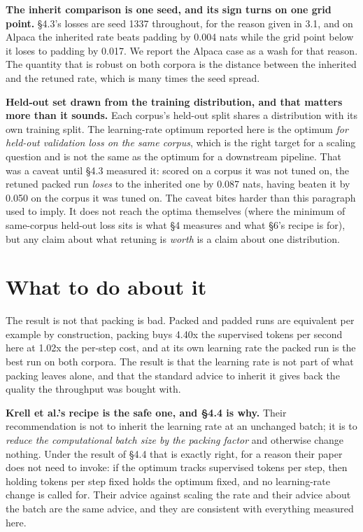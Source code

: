 \documentclass[11pt]{article}
\begin{document}
\textbf{The inherit comparison is one seed, and its sign turns on one grid point.} \S{}4.3's losses are seed 1337 throughout, for the reason given in 3.1, and on Alpaca the inherited rate beats padding by 0.004 nats while the grid point below it loses to padding by 0.017. We report the Alpaca case as a wash for that reason. The quantity that is robust on both corpora is the distance between the inherited and the retuned rate, which is many times the seed spread.

\textbf{Held-out set drawn from the training distribution, and that matters more than it sounds.} Each corpus's held-out split shares a distribution with its own training split. The learning-rate optimum reported here is the optimum \emph{for held-out validation loss on the same corpus}, which is the right target for a scaling question and is not the same as the optimum for a downstream pipeline. That was a caveat until \S{}4.3 measured it: scored on a corpus it was not tuned on, the retuned packed run \emph{loses} to the inherited one by 0.087 nats, having beaten it by 0.050 on the corpus it was tuned on. The caveat bites harder than this paragraph used to imply. It does not reach the optima themselves (where the minimum of same-corpus held-out loss sits is what \S{}4 measures and what \S{}6's recipe is for), but any claim about what retuning is \emph{worth} is a claim about one distribution.

\section{What to do about it}

The result is not that packing is bad. Packed and padded runs are equivalent per example by construction, packing buys 4.40x the supervised tokens per second here at 1.02x the per-step cost, and at its own learning rate the packed run is the best run on both corpora. The result is that the learning rate is not part of what packing leaves alone, and that the standard advice to inherit it gives back the quality the throughput was bought with.

\textbf{Krell et al.'s recipe is the safe one, and \S{}4.4 is why.} Their recommendation is not to inherit the learning rate at an unchanged batch; it is to \emph{reduce the computational batch size by the packing factor} and otherwise change nothing. Under the result of \S{}4.4 that is exactly right, for a reason their paper does not need to invoke: if the optimum tracks supervised tokens per step, then holding tokens per step fixed holds the optimum fixed, and no learning-rate change is called for. Their advice against scaling the rate and their advice about the batch are the same advice, and they are consistent with everything measured here.
\end{document}
